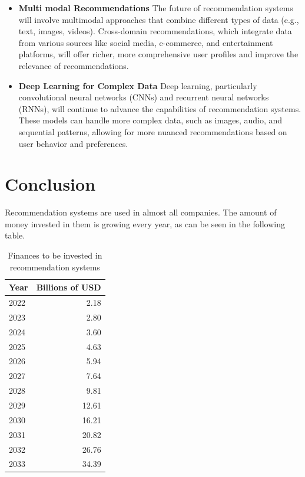 \documentclass[10pt,twoside,slovak,a4paper]{article}
\begin{document}
\begin{itemize}
\item \textbf{Multi modal Recommendations} 
The future of recommendation systems will involve multimodal approaches that combine different types of data (e.g., text, images, videos)\cite{multimodal}. Cross-domain recommendations, which integrate data from various sources like social media, e-commerce, and entertainment platforms, will offer richer, more comprehensive user profiles and improve the relevance of recommendations.


\item \textbf{Deep Learning for Complex Data} 
Deep learning, particularly convolutional neural networks (CNNs)\cite{CNN} and recurrent neural networks (RNNs)\cite{RNN}, will continue to advance the capabilities of recommendation systems. These models can handle more complex data, such as images, audio, and sequential patterns, allowing for more nuanced recommendations based on user behavior and preferences.


\end{itemize}





\section{Conclusion} \label{Conclusion}

Recommendation systems are used in almost all companies. The amount of money invested in them is growing every year, as can be seen in the following table.


\begin{table}[ht]
\centering
    \begin{tabular}{l|r}
        Year  & Billions of USD \\\hline
        2022  & 2.18   \\
        2023  & 2.80   \\
        2024  & 3.60   \\
        2025  & 4.63   \\
        2026  & 5.94   \\
        2027  & 7.64   \\
        2028  & 9.81   \\
        2029  & 12.61  \\
        2030  & 16.21  \\
        2031  & 20.82  \\
        2032  & 26.76  \\
        2033  & 34.39  \\
    \end{tabular}
    \caption{Finances to be invested in recommendation systems}
    \label{tab:widgets}
\end{table}
\end{document}
